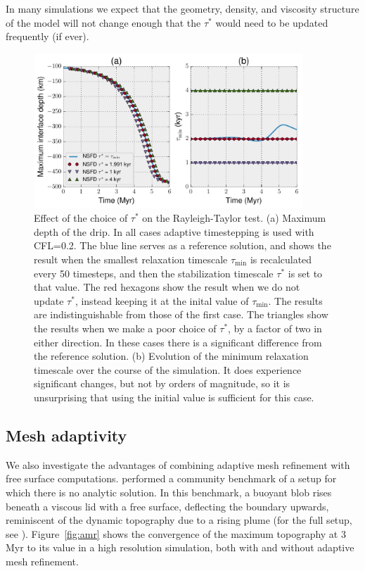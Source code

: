 \documentclass[preprint,12pt,authoryear]{elsarticle}
\begin{document}
In many simulations we expect that the geometry, density, and viscosity structure of the model will not change
enough that the $\tau^*$ would need to be updated frequently (if ever).

\begin{figure}
\includegraphics[width=0.9\textwidth]{figures/rayleigh_taylor_tau_choice.pdf}
\caption[Effect of the choice of $\tau^*$ on the Rayleigh-Taylor test.] {Effect of the choice of $\tau^*$ on the Rayleigh-Taylor test. (a) Maximum depth of the drip. In all cases adaptive timestepping is used with CFL=0.2. The blue line serves as a reference solution, and shows the result when the smallest relaxation timescale $\tau_{\mathrm{min}}$ is recalculated every 50 timesteps, and then the stabilization timescale $\tau^*$ is set to that value. The red hexagons show the result when we do not update $\tau^*$, instead keeping it at the inital value of $\tau_{\mathrm{min}}$. The results are indistinguishable from those of the first case. The triangles show the results when we make a poor choice of $\tau^*$, by a factor of two in either direction. In these cases there is a significant difference from the reference solution. (b) Evolution of the minimum relaxation timescale over the course of the simulation. It does experience significant changes, but not by orders of magnitude, so it is unsurprising that using the initial value is sufficient for this case.}
\label{fig:rayleigh_taylor_tau_choice}
\end{figure}


\subsection{Mesh adaptivity}
\label{sec:mesh_adaptivity}

We also investigate the advantages of combining adaptive mesh refinement with free surface computations.
\citet{crameri2012comparison} performed a community benchmark of a setup for which there is no analytic
solution. In this benchmark, a buoyant blob rises beneath a viscous lid with a free surface, deflecting the
boundary upwards, reminiscent of the dynamic topography due to a rising plume (for the full setup, see \citet{crameri2012comparison}). 
Figure~\ref{fig:amr} shows the convergence of the maximum topography at 3 Myr to its value in a high resolution simulation,
both with and without adaptive mesh refinement.
\end{document}
